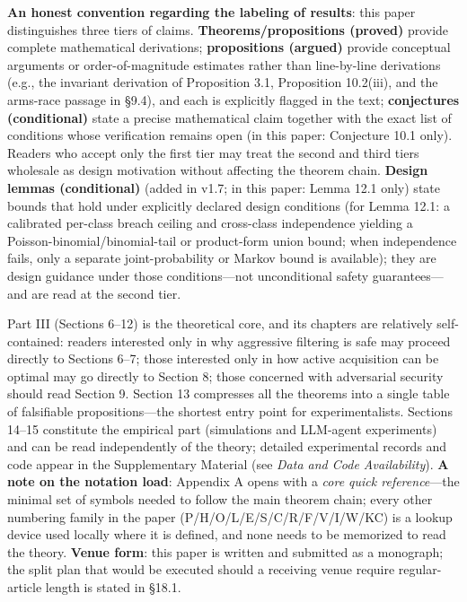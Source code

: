 \documentclass[
  11pt]{article}
\begin{document}
\textbf{An honest convention regarding the labeling of results}: this
paper distinguishes three tiers of claims. \textbf{Theorems/propositions
(proved)} provide complete mathematical derivations;
\textbf{propositions (argued)} provide conceptual arguments or
order-of-magnitude estimates rather than line-by-line derivations (e.g.,
the invariant derivation of Proposition 3.1, Proposition 10.2(iii), and
the arms-race passage in §9.4), and each is explicitly flagged in the
text; \textbf{conjectures (conditional)} state a precise mathematical
claim together with the exact list of conditions whose verification
remains open (in this paper: Conjecture 10.1 only). Readers who accept
only the first tier may treat the second and third tiers wholesale as
design motivation without affecting the theorem chain. \textbf{Design
lemmas (conditional)} (added in v1.7; in this paper: Lemma 12.1 only)
state bounds that hold under explicitly declared design conditions (for
Lemma 12.1: a calibrated per-class breach ceiling and cross-class
independence yielding a Poisson-binomial/binomial-tail or product-form
union bound; when independence fails, only a separate joint-probability
or Markov bound is available); they are design guidance under those
conditions---not unconditional safety guarantees---and are read at the
second tier.

Part III (Sections 6--12) is the theoretical core, and its chapters are
relatively self-contained: readers interested only in why aggressive
filtering is safe may proceed directly to Sections 6--7; those
interested only in how active acquisition can be optimal may go directly
to Section 8; those concerned with adversarial security should read
Section 9. Section 13 compresses all the theorems into a single table of
falsifiable propositions---the shortest entry point for
experimentalists. Sections 14--15 constitute the empirical part
(simulations and LLM-agent experiments) and can be read independently of
the theory; detailed experimental records and code appear in the
Supplementary Material (see \emph{Data and Code Availability}).
\textbf{A note on the notation load}: Appendix A opens with a \emph{core
quick reference}---the minimal set of symbols needed to follow the main
theorem chain; every other numbering family in the paper
(P/H/O/L/E/S/C/R/F/V/I/W/KC) is a lookup device used locally where it is
defined, and none needs to be memorized to read the theory.
\textbf{Venue form}: this paper is written and submitted as a monograph;
the split plan that would be executed should a receiving venue require
regular-article length is stated in §18.1.
\end{document}

